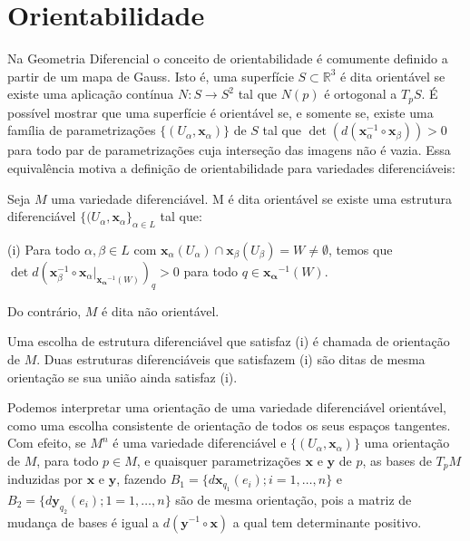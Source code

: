 \iffalse

	\section{Orientabilidade}
	\label{sec:orientabilidade}
	Na Geometria Diferencial o conceito de orientabilidade é comumente definido a partir de um mapa de Gauss. Isto é, uma superfície $S \subset \mathbb{R}^{3}$ é dita orientável se existe uma aplicação contínua $N:S\to S^{2}$ tal que $N(p)$ é ortogonal a $T_{p}S$.
	É possível mostrar que uma superfície é orientável se, e somente se, existe uma família de parametrizações $\{ (U_{\alpha}, \mathbf{x}_{\alpha}) \}$ de $S$ tal que $\det(d(\mathbf{x}_{\alpha}^{-1} \circ \mathbf{x}_{\beta}))>0$ para todo par de parametrizações cuja interseção das imagens não é vazia.
	Essa equivalência motiva a definição de orientabilidade para variedades diferenciáveis:
	\begin{definition}
		\label{def:orientabilidade}
		Seja $M$ uma variedade diferenciável. M é dita orientável se existe uma estrutura diferenciável $\{ (U_{\alpha}, \mathbf{x}_{\alpha} \}_{\alpha \in L}$ tal que:

		(i) Para todo $\alpha, \beta \in L$ com $\mathbf{x}_{\alpha}(U_{\alpha})\cap \mathbf{x}_{\beta}(U_{\beta}) = W \neq \emptyset$, temos que $\det d(\mathbf{x}_{\beta}^{-1}\circ \mathbf{x}_{\alpha}|_{\mathbf{x_{\alpha}}^{-1}(W)})_{q} >0$ para todo $q\in \mathbf{x_{\alpha}}^{-1}(W)$.

		Do contrário, $M$ é dita não orientável.

		Uma escolha de estrutura diferenciável que satisfaz (i) é chamada de orientação de $M$.
		Duas estruturas diferenciáveis que satisfazem (i) são ditas de mesma orientação se sua união ainda satisfaz (i).
	\end{definition}
	Podemos interpretar uma orientação de uma variedade diferenciável orientável, como uma escolha consistente de orientação de todos os seus espaços tangentes. Com efeito, se $M^{n}$ é uma variedade diferenciável e $\{ (U_{\alpha}, \mathbf{x}_{\alpha}) \}$ uma orientação de $M$, para todo $p \in M$, e quaisquer parametrizações $\mathbf{x}$ e $\mathbf{y}$ de $p$, as bases de $T_{p}M$ induzidas por $\mathbf{x}$ e $\mathbf{y}$, fazendo $B_{1}=\{ d\mathbf{x}_{q_{1}}(e_{i});i =1, \dots, n \}$ e $B_{2}=\{ d\mathbf{y}_{q_{2}}(e_{i});1=1, \dots, n \}$ são de mesma orientação, pois a matriz de mudança de bases é igual a $d(\mathbf{y}^{-1} \circ \mathbf{x})$ a qual tem determinante positivo.

